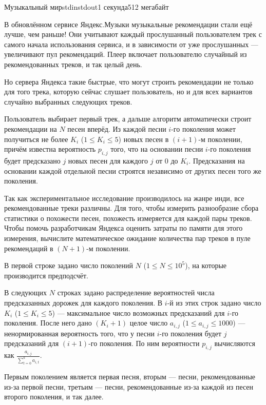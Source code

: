 \begin{problem}{Музыкальный мир}{stdin}{stdout}{1 секунда}{512 мегабайт}

В обновлённом сервисе Яндекс.Музыки музыкальные рекомендации стали ещё лучше, чем раньше! Они учитывают каждый прослушанный пользователем трек с самого начала использования сервиса, и в зависимости от уже прослушанных --- увеличивают пул рекомендаций. Плеер включает пользователю случайный из рекомендованных треков, и так целый день.

Но сервера Яндекса такие быстрые, что могут строить рекомендации не только для того трека, которую сейчас слушает пользователь, но и для всех вариантов случайно выбранных следующих треков.

Пользователь выбирает первый трек, а дальше алгоритм автоматически строит рекомендации на $N$ песен вперёд. Из каждой песни $i$-го поколения может получиться не более $K_i$ ($1 \le K_i \le 5$) новых песен в $(i + 1)$-м поколении, причём известна вероятность $p_{i, j}$ того, что на основании песни $i$-го поколения будет предсказано $j$ новых песен для каждого $j$ от $0$ до $K_i$. Предсказания на основании каждой отдельной песни строятся независимо от других песен того же поколения.

Так как экспериментальное исследование производилось на жанре инди, все рекомендованные треки различны. Для того, чтобы измерить разнообразие сбора статистики о похожести песен, похожесть измеряется для каждой пары треков. Чтобы помочь разработчикам Яндекса оценить затраты по памяти для этого измерения, вычислите математическое ожидание количества пар треков в пуле рекомендаций в $(N + 1)$-м поколении.

\InputFile
В первой строке задано число поколений $N$ ($1 \le N \le 10^5$), на которые производится предподсчёт.

В следующих $N$ строках задано распределение вероятностей числа предсказанных дорожек для каждого поколения.
В $i$-й из этих строк задано число $K_i$ ($1 \le K_i \le 5$) --- максимальное число возможных предсказаний для $i$-го поколения.
После него дано $(K_i + 1)$ целое число $a_{i, j}$ ($1 \le a_{i, j} \le 1000$) --- ненормированная вероятность того, что у песни $i$-го поколения будет $j$ предсказаний для $(i + 1)$-го поколения. По ним вероятности $p_{i,j}$ вычисляются как $\frac{a_{i,j}}{\sum\limits_{t=0}^{k}{a_{i,t}}}$.

Первым поколением является первая песня, вторым --- песни, рекомендованные из-за первой песни, третьим --- песни, рекомендованные из-за каждой из песен второго поколения, и так далее.


\end{problem}
